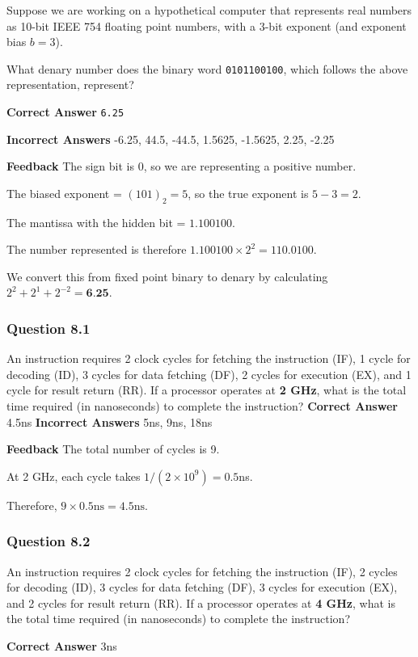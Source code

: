 Suppose we are working on a hypothetical computer that represents real numbers as 10-bit IEEE 754 floating point numbers, with a 3-bit exponent (and exponent bias $b = 3$).

What denary number does the binary word \texttt{0101100100}, which follows the above representation, represent?

\textbf{Correct Answer}
\texttt{6.25}

\textbf{Incorrect Answers}
-6.25, 44.5, -44.5, 1.5625, -1.5625, 2.25, -2.25

\textbf{Feedback}
The sign bit is $0$, so we are representing a positive number.

The biased exponent = $(101)_2 = 5$, so the true exponent is $5 - 3 = 2$.

The mantissa with the hidden bit = $1.100100$.

The number represented is therefore $1.100100 \times 2^2 = 110.0100$.

We convert this from fixed point binary to denary by calculating $2^2 + 2^1 + 2^{-2} = \textbf{6.25}$.

\subsubsection{Question 8.1}
An instruction requires 2 clock cycles for fetching the instruction (IF), 1 cycle for decoding (ID), 3 cycles for data fetching (DF), 2 cycles for execution (EX), and 1 cycle for result return (RR). If a processor operates at \textbf{2 GHz}, what is the total time required (in nanoseconds) to complete the instruction?
\textbf{Correct Answer}
4.5ns
\textbf{Incorrect Answers}
5ns, 9ns, 18ns

\textbf{Feedback}
The total number of cycles is 9.

At 2 GHz, each cycle takes $1/(2 \times 10^9) = 0.5$ns.

Therefore, $9 \times 0.5\text{ns} = 4.5\text{ns}$.
\subsubsection{Question 8.2}

An instruction requires 2 clock cycles for fetching the instruction (IF), 2 cycles for decoding (ID), 3 cycles for data fetching (DF), 3 cycles for execution (EX), and 2 cycles for result return (RR). If a processor operates at \textbf{4 GHz}, what is the total time required (in nanoseconds) to complete the instruction?

\textbf{Correct Answer}
3ns

